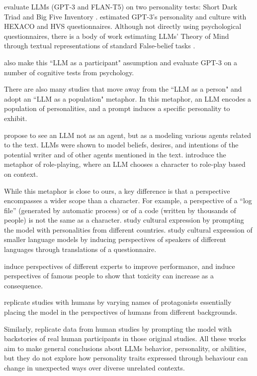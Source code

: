 \citet{li2022gpt} evaluate LLMs (GPT-3 and FLAN-T5) on two personality tests: Short Dark Triad \citep{sd3} and Big Five Inventory \citep{bfi}. \cite{Miotto2022-jq} estimated GPT-3's personality and culture with HEXACO \citep{hexaco} and HVS \citep{hvs} questionnaires. Although not directly using psychological questionnaires, there is a body of work estimating LLMs' Theory of Mind through textual representations of standard False-belief tasks \citep{kosinski2023theory,sap2022neural}.

\citet{Binz2022UsingCP} also make this ``LLM as a participant" assumption and evaluate GPT-3 on a number of cognitive tests from psychology.

There are also many studies that move away from the ``LLM as a person" and adopt an ``LLM as a population" metaphor. In this metaphor, an LLM encodes a population of personalities, and a prompt induces a specific personality to exhibit.

\citet{Andreas2022-wr} propose to see an LLM not as an agent, but as a modeling  various agents related to the text. LLMs were shown to model beliefs, desires, and intentions of the potential writer and of other agents mentioned in the text.
\citet{shanahan2023role} introduce the metaphor of role-playing, where an LLM chooses a character to role-play based on context.

While this metaphor is close to ours, a key difference is that a perspective encompasses a wider scope than a character. For example, a perspective of a ``log file'' (generated by automatic process) or of a code (written by thousands of people) is not the same as a character.
\citet{Cao2023-gz} study cultural expression by prompting the model with personalities from different countries.
\citet{Arora2022-ge} study cultural expression of smaller language models by inducing perspectives of speakers of different languages through translations of a questionnaire.

\citet{salewski2023context} induce perspectives of different experts to improve performance, and \citet{Deshpande2023-ui} induce perspectives of famous people to show that toxicity can increase as a consequence.

\citet{Aher2022-tj} replicate studies with humans by varying names of protagonists essentially placing the model in the perspectives of humans from different backgrounds.

Similarly, \citet{argyle2023out} replicate data from human studies by prompting the model with backstories of real human participants in those original studies. All these works aim to make general conclusions about LLMs behavior, personality, or abilities, but they do not explore how personality traits expressed through behaviour can change in unexpected ways over diverse unrelated contexts.


